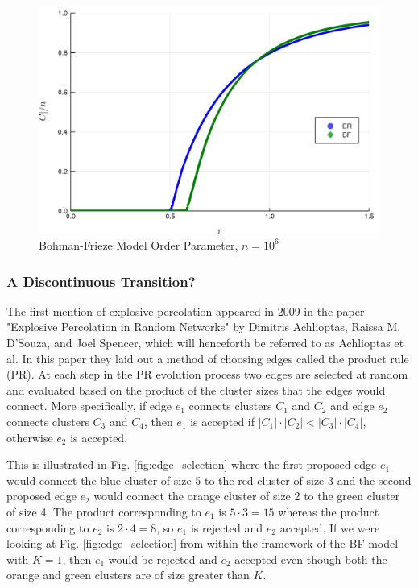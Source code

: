 \begin{figure}[H]
	\centering
	\includegraphics[width=350pt]{images/ER_BF_1e6_order_param.png}
	\caption{Bohman-Frieze Model Order Parameter, $n = 10^6$}
	\label{fig:ER_BF_transition}
\end{figure}

\subsubsection{A Discontinuous Transition?}
The first mention of explosive percolation appeared in 2009 in the paper "Explosive Percolation in Random Networks" \cite{Achlioptas} by Dimitris Achlioptas, Raissa M. D’Souza, and Joel Spencer, which will henceforth be referred to as Achlioptas et al.
In this paper they laid out a method of choosing edges called the product rule (PR).
At each step in the PR evolution process two edges are selected at random and evaluated based on the product of the cluster sizes that the edges would connect.
More specifically, if edge $e_1$ connects clusters $C_1$ and $C_2$ and edge $e_2$ connects clusters $C_3$ and $C_4$, then $e_1$ is accepted if $|C_1| \cdot |C_2| < |C_3| \cdot |C_4|$, otherwise $e_2$ is accepted.

This is illustrated in Fig. \ref{fig:edge_selection} where the first proposed edge $e_1$ would connect the blue cluster of size 5 to the red cluster of size 3 and the second proposed edge $e_2$ would connect the orange cluster of size 2 to the green cluster of size 4.
The product corresponding to $e_1$ is $5 \cdot 3 = 15$ whereas the product corresponding to $e_2$ is $2 \cdot 4 = 8$, so $e_1$ is rejected and $e_2$ accepted.
If we were looking at Fig. \ref{fig:edge_selection} from within the framework of the BF model with $K = 1$, then $e_1$ would be rejected and $e_2$ accepted even though both the orange and green clusters are of size greater than $K$.

